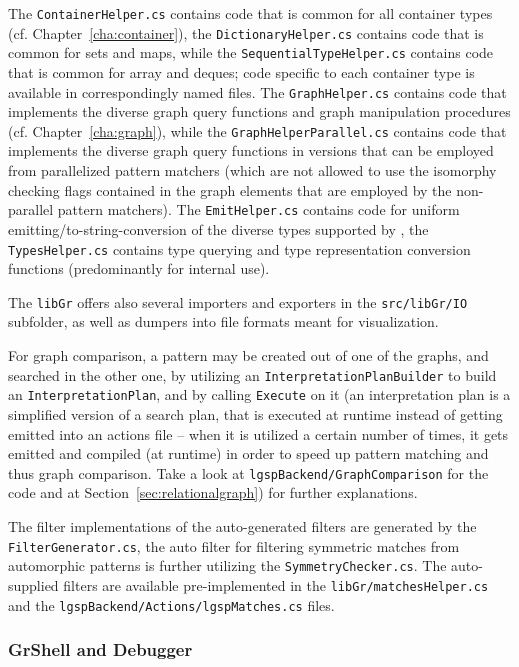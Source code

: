The \texttt{ContainerHelper.cs} contains code that is common for all container types (cf. Chapter~\ref{cha:container}), the \texttt{DictionaryHelper.cs} contains code that is common for sets and maps, while the \texttt{SequentialTypeHelper.cs} contains code that is common for array and deques; code specific to each container type is available in correspondingly named files.
The \texttt{GraphHelper.cs} contains code that implements the diverse graph query functions and graph manipulation procedures (cf. Chapter~\ref{cha:graph}), while the \texttt{GraphHelperParallel.cs} contains code that implements the diverse graph query functions in versions that can be employed from parallelized pattern matchers (which are not allowed to use the isomorphy checking flags contained in the graph elements that are employed by the non-parallel pattern matchers).
The \texttt{EmitHelper.cs} contains code for uniform emitting/to-string-conversion of the diverse types supported by \GrG, the \texttt{TypesHelper.cs} contains type querying and type representation conversion functions (predominantly for internal use).

The \texttt{libGr} offers also several importers and exporters in the \texttt{src/libGr/IO} subfolder, as well as dumpers into file formats meant for visualization.

For graph comparison, a pattern may be created out of one of the graphs, and searched in the other one, by utilizing an \texttt{Interpretation\-Plan\-Builder} to build an \texttt{Interpretation\-Plan}, and by calling \texttt{Execute} on it (an interpretation plan is a simplified version of a search plan, that is executed at runtime instead of getting emitted into an actions file -- when it is utilized a certain number of times, it gets emitted and compiled (at runtime) in order to speed up pattern matching and thus graph comparison.
Take a look at \texttt{lgspBackend/Graph\-Comparison} for the code and at Section~\ref{sec:relationalgraph}) for further explanations.

The filter implementations of the auto-generated filters are generated by the \texttt{Filter\-Generator.cs}, the auto filter for filtering symmetric matches from automorphic patterns is further utilizing the \texttt{Symmetry\-Checker.cs}.
The auto-supplied filters are available pre-implemented in the \texttt{libGr/matches\-Helper.cs} and the \texttt{lgsp\-Backend/Actions/lgsp\-Matches.cs} files.

\subsubsection*{GrShell and Debugger}

